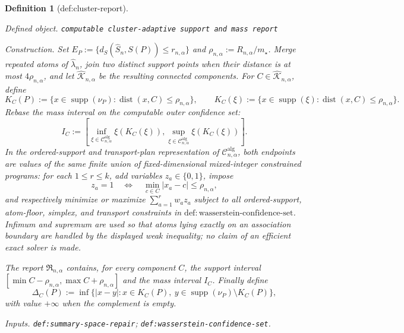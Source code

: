 \documentclass{article}
\newtheorem{definition}{Definition}
\begin{document}
\begin{definition}[def:cluster-report]\label{def:cluster-report}
\par\smallskip\noindent\emph{Defined object.} \texttt{computable cluster-\allowbreak{}adaptive support and mass report}
\par\smallskip\noindent\emph{Construction.} Set \(E_P:=\{d_S(\widehat S_n,S(P))\le r_{n,\alpha}\}\) and
\(\rho_{n,\alpha}:=R_{n,\alpha}/m_\star\).  Merge repeated atoms of \(\widehat\lambda_n\), join two distinct support points when their distance is at most \(4\rho_{n,\alpha}\), and let \(\widehat{\mathscr K}_{n,\alpha}\) be the resulting connected components.  For \(C\in\widehat{\mathscr K}_{n,\alpha}\), define
\[
K_C(P):=\{x\in\operatorname{supp}(\nu_P):\operatorname{dist}(x,C)\le\rho_{n,\alpha}\},
\qquad
K_C(\xi):=\{x\in\operatorname{supp}(\xi):\operatorname{dist}(x,C)\le\rho_{n,\alpha}\}.
\]
Rebase the mass interval on the computable outer confidence set:
\[
I_C:=\left[
\inf_{\xi\in\mathcal C^{\mathrm{alg}}_{n,\alpha}}\xi(K_C(\xi)),
\sup_{\xi\in\mathcal C^{\mathrm{alg}}_{n,\alpha}}\xi(K_C(\xi))
\right].
\]
In the ordered-support and transport-plan representation of \(\mathcal C^{\mathrm{alg}}_{n,\alpha}\), both endpoints are values of the same finite union of fixed-dimensional mixed-integer constrained programs: for each \(1\le r\le k\), add variables \(z_a\in\{0,1\}\), impose
\[
z_a=1\quad\Longleftrightarrow\quad
\min_{c\in C}|x_a-c|\le\rho_{n,\alpha},
\]
and respectively minimize or maximize \(\sum_{a=1}^rw_az_a\) subject to all ordered-support, atom-floor, simplex, and transport constraints in \(\mathrm{def:wasserstein\text{-}confidence\text{-}set}\).  Infimum and supremum are used so that atoms lying exactly on an association boundary are handled by the displayed weak inequality; no claim of an efficient exact solver is made.

The report \(\mathfrak R_{n,\alpha}\) contains, for every component \(C\), the support interval
\([\min C-\rho_{n,\alpha},\max C+\rho_{n,\alpha}]\) and the mass interval \(I_C\).  Finally define
\[
\Delta_C(P):=\inf\{|x-y|:x\in K_C(P),\ y\in\operatorname{supp}(\nu_P)\setminus K_C(P)\},
\]
with value \(+\infty\) when the complement is empty.
\par\smallskip\noindent\emph{Inputs.} \texttt{def:\allowbreak{}summary-\allowbreak{}space-\allowbreak{}repair}; \texttt{def:\allowbreak{}wasserstein-\allowbreak{}confidence-\allowbreak{}set}.
\end{definition}
\end{document}
